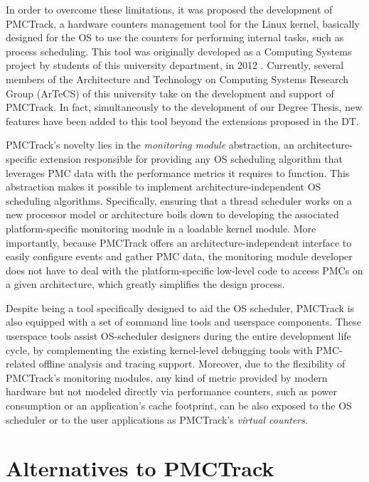 In order to overcome these limitations, it was proposed the development
of PMCTrack, a hardware counters management tool for the Linux kernel,
basically designed for the OS to use the counters for performing
internal tasks, such as process scheduling. This tool was originally
developed as a Computing Systems project by students of this university
department, in 2012 \cite{MSDTFG12}. Currently, several members of the
Architecture and Technology on Computing Systems Research Group (ArTeCS)
of this university take on the development and support of PMCTrack. In
fact, simultaneously to the development of our Degree Thesis, new
features have been added to this tool beyond the extensions proposed in
the DT.

PMCTrack's novelty lies in the \textit{monitoring module} abstraction,
an architecture-specific extension responsible for providing any OS
scheduling algorithm that leverages PMC data with the performance
metrics it requires to function. This abstraction makes it possible to
implement architecture-independent OS scheduling algorithms.
Specifically, ensuring that a thread scheduler works on a new processor
model or architecture boils down to developing the associated
platform-specific monitoring module in a loadable kernel module. More
importantly, because PMCTrack offers an architecture-independent
interface to easily configure events and gather PMC data, the monitoring
module developer does not have to deal with the platform-specific
low-level code to access PMCs on a given architecture, which greatly
simplifies the design process.

Despite being a tool specifically designed to aid the OS scheduler,
PMCTrack is also equipped with a set of command line tools and userspace
components. These userspace tools assist OS-scheduler designers during
the entire development life cycle, by complementing the existing
kernel-level debugging tools with PMC-related offline analysis and
tracing support. Moreover, due to the flexibility of PMCTrack's
monitoring modules, any kind of metric provided by modern hardware but
not modeled directly via performance counters, such as power consumption
or an application's cache footprint, can be also exposed to the OS
scheduler or to the user applications as PMCTrack's
\textit{virtual counters}.

\section{Alternatives to PMCTrack}\label{alternatives-to-pmctrack}

